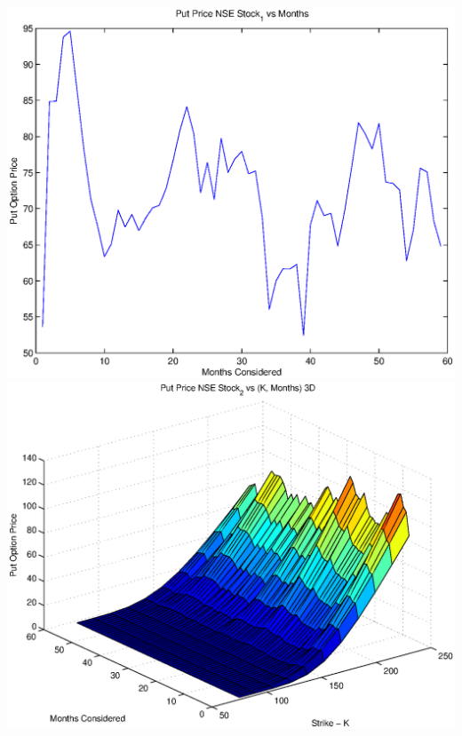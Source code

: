 \documentclass{article}
\begin{document}
\includegraphics[width=\textwidth]{Put_Price_NSE_Stock_1_vs_Months} \\

\includegraphics[width=\textwidth]{Put_Price_NSE_Stock_2_vs_(K,_Months)_3D} \\
\end{document}
